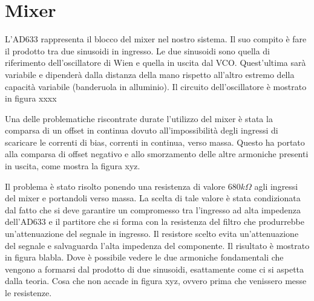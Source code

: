 \documentclass[titlepage]{report}
\begin{document}
\section{Mixer}
\label{sec:Mixer}


L'AD633 rappresenta il blocco del mixer nel nostro sistema. Il suo compito è fare il prodotto tra due sinusoidi in ingresso. Le due sinusoidi sono quella di riferimento dell'oscillatore di Wien e quella in uscita dal VCO. Quest'ultima sarà variabile e dipenderà dalla distanza della mano rispetto all'altro estremo della capacità variabile (banderuola in alluminio). Il circuito dell'oscillatore è mostrato in figura xxxx


Una delle problematiche riscontrate durate l'utilizzo del mixer è stata la comparsa di un offset in continua dovuto all'impossibilità degli ingressi di scaricare le correnti di bias, correnti in continua, verso massa. Questo ha portato alla comparsa di offset negativo e allo smorzamento delle altre armoniche presenti in uscita, come mostra la figura xyz.



Il problema è stato risolto ponendo una resistenza di valore $680k\Omega$ agli ingressi del mixer e portandoli verso massa. La scelta di tale valore è stata condizionata dal fatto che si deve garantire un compromesso tra l'ingresso ad alta impedenza dell'AD633 e il partitore che si forma con la resistenza del filtro che produrrebbe un'attenuazione del segnale in ingresso. Il resistore scelto evita un'attenuazione del segnale e salvaguarda l'alta impedenza del componente. Il risultato è mostrato in figura blabla. Dove è possibile vedere le due armoniche fondamentali che vengono a formarsi dal prodotto di due sinusoidi, esattamente come ci si aspetta dalla teoria. Cosa che non accade in figura xyz, ovvero prima che venissero messe le resistenze.
	
	
\end{document}
